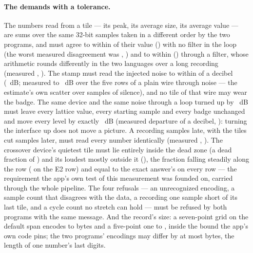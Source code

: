 \documentclass[11pt,a4paper]{article}
\begin{document}
\paragraph{The demands with a tolerance.} The numbers read from a tile
--- its peak, its average size, its average value --- are sums over the
same 32-bit samples taken in a different order by the two programs, and
must agree to within \mparitySwiftRelativeWords{} of their value
(\mparitySwiftRelative) with no filter in the loop (the worst measured
disagreement was \mparityWorstSwiftWords{}, \mparityWorstSwift) and to
within \mparitySwiftRelativeFilteredWords{} (\mparitySwiftRelativeFiltered)
through a filter, whose arithmetic rounds differently in the two
languages over a long recording (measured
\mparityWorstSwiftFilteredWords{}, \mparityWorstSwiftFiltered). The
stamp must read the injected noise to within \mparityStampWords{} of a
decibel (\mparityStamp{}~dB; measured \mparityStampScatterLow{} to
\mparityStampScatterHigh{}~dB over the five rows of a plain wire through
noise --- the estimate's own scatter over \mparityStampSamples{} samples
of silence), and no tile of that wire may wear the badge. The same
device and the same noise through a loop turned up by
\wmParityGainDB{}~dB must leave every lattice value, every starting
sample and every badge unchanged and move every level by exactly
\wmParityGainDB{}~dB (measured departure \mparityGainShiftWords{} of a
decibel, \mparityGainShift): turning the interface up does not move a
picture. A recording \wmParityLatencySamples{} samples late, with the
tiles cut \wmParityLatencySamples{} samples later, must read every
number identically (measured \mparityLatencyMoveWords{},
\mparityLatencyMove). The crossover device's quietest tile must lie
entirely inside the dead zone (a dead fraction of \mparityDeadQuiet) and
its loudest mostly outside it (\mparityDeadLoud), the fraction falling
steadily along the row (\mparityDeadRow{} on the E2 row) and equal to
the exact answer's on every row --- the requirement the app's own test of
this measurement was founded on, carried through the whole pipeline. The
four refusals --- an unrecognized encoding, a sample count that
disagrees with the data, a recording one sample short of its last tile,
and a cycle count no stretch can hold --- must be refused by both
programs with the same message. And the record's size: a seven-point
grid on the default span encodes to \mparityPayloadSeven{} bytes and a
five-point one to \mparityPayloadFive{}, inside the bound the app's own
code pins; the two programs' encodings may differ by at most
\mparityPayloadBytes{} bytes, the length of one number's last digits.
\mparityPartBStatus
\end{document}
